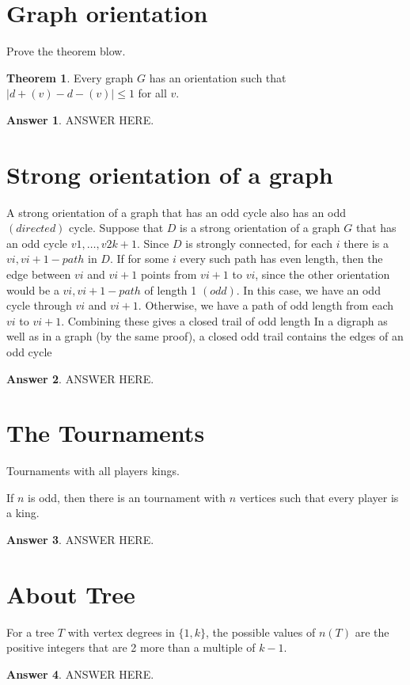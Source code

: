 \documentclass[a4paper]{article}
\renewcommand{\(}{\left(}
\renewcommand{\)}{\right)}
\theoremstyle{plain}
\theoremstyle{plain}
\theoremstyle{definition}
\newtheorem*{answer}{Answer}
\newtheorem{theorem}{Theorem}[section]
\begin{document}
\section{Graph orientation}
Prove the theorem blow.
\begin{theorem}
Every graph $G$ has an orientation such that $|d +(v) - d-(v)| \leq 1$ for all $v$.
\end{theorem}
\begin{shaded}
\begin{answer}
ANSWER HERE.
\end{answer}
\end{shaded}


\section{Strong orientation of a graph}
A strong orientation of a graph that has an odd cycle also has an odd $(directed)$ cycle. Suppose that $D$ is a strong orientation of a graph $G$ that has an odd cycle $v1, \dots , v2k+1$. Since $D$ is strongly connected, for each $i$ there is a $vi, vi+1-path$ in $D$. If for some $i$ every such path has even length, then the edge between $vi$ and $vi+1$ points from $vi+1$ to $vi$, since the other orientation would be a $vi, vi+1-path$ of length 1 $(odd)$. In this case, we have an odd cycle through $vi$ and $vi+1$. Otherwise, we have a path of odd length from each $vi$ to $vi+1$. Combining these gives a closed trail of odd length In a digraph as well as in a graph (by the same proof), a closed odd trail contains the edges of an odd cycle
\begin{shaded}
\begin{answer}
ANSWER HERE.
\end{answer}
\end{shaded}

\section{The Tournaments}
Tournaments with all players kings.

 If $n$ is odd, then there is an tournament with $n$ vertices such that every player is a king.
\begin{shaded}
\begin{answer}
ANSWER HERE.
\end{answer}
\end{shaded}


\section{About Tree}
For a tree $T$ with vertex degrees in $\{1, k\}$, the possible values of $n(T)$ are the positive integers that are 2 more than a multiple of $k − 1$.
\begin{shaded}
\begin{answer}
ANSWER HERE.
\end{answer}
\end{shaded}
\end{document}
